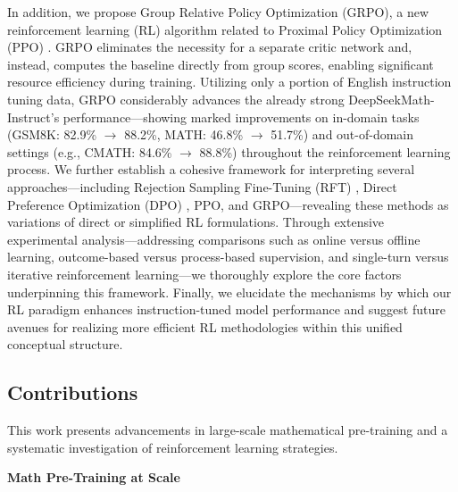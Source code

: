 In addition, we propose Group Relative Policy Optimization (GRPO), a new reinforcement learning (RL) algorithm related to Proximal Policy Optimization (PPO) \citep{schulman2017proximal}. GRPO eliminates the necessity for a separate critic network and, instead, computes the baseline directly from group scores, enabling significant resource efficiency during training. Utilizing only a portion of English instruction tuning data, GRPO considerably advances the already strong DeepSeekMath-Instruct’s performance—showing marked improvements on in-domain tasks (GSM8K: 82.9\% $\rightarrow$ 88.2\%, MATH: 46.8\% $\rightarrow$ 51.7\%) and out-of-domain settings (e.g., CMATH: 84.6\% $\rightarrow$ 88.8\%) throughout the reinforcement learning process. We further establish a cohesive framework for interpreting several approaches—including Rejection Sampling Fine-Tuning (RFT) \citep{yuan2023scaling}, Direct Preference Optimization (DPO) \citep{dpo}, PPO, and GRPO—revealing these methods as variations of direct or simplified RL formulations. Through extensive experimental analysis—addressing comparisons such as online versus offline learning, outcome-based versus process-based supervision, and single-turn versus iterative reinforcement learning—we thoroughly explore the core factors underpinning this framework. Finally, we elucidate the mechanisms by which our RL paradigm enhances instruction-tuned model performance and suggest future avenues for realizing more efficient RL methodologies within this unified conceptual structure.

\subsection{Contributions}
This work presents advancements in large-scale mathematical pre-training and a systematic investigation of reinforcement learning strategies.

\textbf{Math Pre-Training at Scale}

